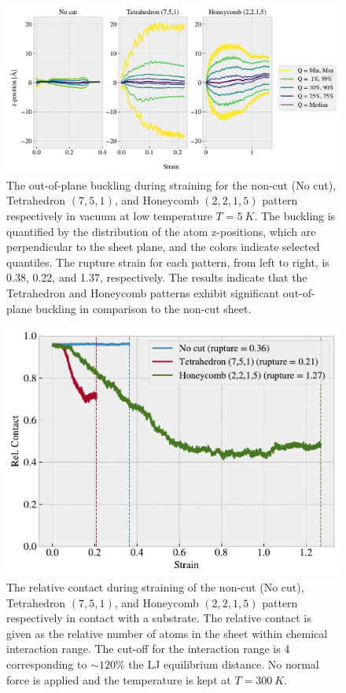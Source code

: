 \begin{figure}[!htb]
  \centering
  \includegraphics[width=\linewidth]{figures/baseline/vacuum_normal_buckling.pdf}
  \caption{The out-of-plane buckling during straining for the non-cut (No cut), Tetrahedron $(7,5,1)$, and Honeycomb $(2,2,1,5)$ pattern respectively in vacuum at low temperature $T = \SI{5}{K}$. The buckling is quantified by the distribution of the atom z-positions, which are perpendicular to the sheet plane, and the colors indicate selected quantiles. The rupture strain for each pattern, from left to right, is 0.38, 0.22, and 1.37, respectively. The results indicate that the Tetrahedron and Honeycomb patterns exhibit significant out-of-plane buckling in comparison to the non-cut sheet.}
  \label{fig:buckling_quartiles}
\end{figure}


\begin{figure}[!htb]
  \centering
  \includegraphics[width=0.5\linewidth]{figures/baseline/contact_vs_stretch.pdf}
  \caption{The relative contact during straining of the non-cut (No cut), Tetrahedron $(7,5,1)$, and Honeycomb $(2,2,1,5)$ pattern respectively in contact with a substrate. The relative contact is given as the relative number of atoms in the sheet within chemical interaction range. The cut-off for the interaction range is \SI{4}{} corresponding to $\sim 120 \%$ the \acrshort{LJ} equilibrium distance. No normal force is applied and the temperature is kept at $T = \SI{300}{K}$.}
  \label{fig:contact_vs_stretch}
\end{figure}




